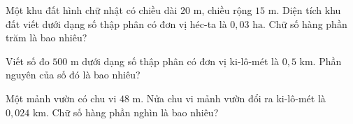 \begin{ex}
  Một khu đất hình chữ nhật có chiều dài $20\text{ m}$, chiều rộng $15\text{ m}$. Diện tích khu đất viết dưới dạng số thập phân có đơn vị héc-ta là $0{,}03\text{ ha}$. Chữ số hàng phần trăm là bao nhiêu?
\end{ex}

\begin{ex}
  Viết số đo $500\text{ m}$ dưới dạng số thập phân có đơn vị ki-lô-mét là $0{,}5\text{ km}$. Phần nguyên của số đó là bao nhiêu?
\end{ex}

\begin{ex}
  Một mảnh vườn có chu vi $48\text{ m}$. Nửa chu vi mảnh vườn đổi ra ki-lô-mét là $0{,}024\text{ km}$. Chữ số hàng phần nghìn là bao nhiêu?
\end{ex}
